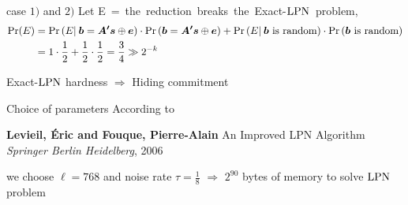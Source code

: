 \begin{frame}

  \begin{center}
  \end{center}

  \begin{block}{case $1)$ and $2)$ }
  Let \mbox{E = {the reduction breaks the Exact-$\mathrm{LPN}$ problem}},  
  \begin{align*}
    \Pr(E) &= \Pr \left( E | \:\boldsymbol{b}  = \boldsymbol{A'} \boldsymbol{s} \mathbin{\oplus} \boldsymbol{e}  \right)  \cdot  \Pr \left( \boldsymbol{b}  = \boldsymbol{A'} \boldsymbol{s} \mathbin{\oplus} \boldsymbol{e}  \right)  + \Pr \left( E   | \: \boldsymbol{b} \text{ is random}  \right)   \cdot \Pr \left(   \boldsymbol{b} \text{ is random} \right) \\
	  &=  1  \cdot   \frac{1}{2}  +  \frac{1}{2}  \cdot  \frac{1}{2} = \frac{3}{4} \gg 2^{-k}
  \end{align*}
  \begin{center}   
      \centering Exact-$\mathrm{LPN}$ hardness $\Rightarrow$ Hiding commitment
  \end{center}
  \end{block}

\end{frame}

\begin{frame}
\begin{block}{Choice of parameters}
According to
\begin{center}
\begin{thebibliography}{XX}
   			 \textbf{Levieil, \'Eric and Fouque, Pierre-Alain}
  			 \newblock An Improved LPN Algorithm
   				\newblock \emph{Springer Berlin Heidelberg}, 2006
			\end{thebibliography} 
\end{center}

we choose $\ell=768$ and noise rate $\tau = \frac{1}{8}$ $\Rightarrow$ $2^{90}$ bytes of memory to solve $\mathrm{LPN}$ problem
\end{block}

\end{frame}
 
